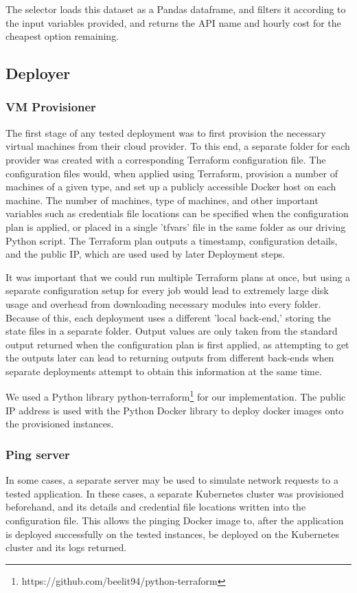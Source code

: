 \documentclass{article}
\begin{document}
The selector loads this dataset as a Pandas dataframe, and filters it according to the input variables provided, and returns the API name and hourly cost for the cheapest option remaining.

\subsection{Deployer}
\subsubsection{VM Provisioner}
The first stage of any tested deployment was to first provision the necessary virtual machines from their cloud provider. To this end, a separate folder for each provider was created with a corresponding Terraform configuration file. The configuration files would, when applied using Terraform, provision a number of machines of a given type, and set up a publicly accessible Docker host on each machine. The number of machines, type of machines, and other important variables such as credentials file locations can be specified when the configuration plan is applied, or placed in a single 'tfvars' file in the same folder as our driving Python script. The Terraform plan outputs a timestamp, configuration details, and the public IP, which are used used by later Deployment steps.

It was important that we could run multiple Terraform plans at once, but using a separate configuration setup for every job would lead to extremely large disk usage and overhead from downloading necessary modules into every folder. Because of this, each deployment uses a different 'local back-end,' storing the state files in a separate folder. Output values are only taken from the standard output returned when the configuration plan is first applied, as attempting to get the outputs later can lead to returning outputs from different back-ends when separate deployments attempt to obtain this information at the same time.

We used a Python library python-terraform\footnote{https://github.com/beelit94/python-terraform} for our implementation. The public IP address is used with the Python Docker library to deploy docker images onto the provisioned instances.

\subsubsection{Ping server}
In some cases, a separate server may be used to simulate network requests to a tested application. In these cases, a separate Kubernetes cluster was provisioned beforehand, and its details and credential file locations written into the configuration file. This allows the pinging Docker image to, after the application is deployed successfully on the tested instances, be deployed on the Kubernetes cluster and its logs returned.
\end{document}
